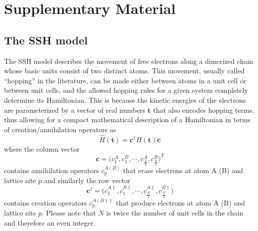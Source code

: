 \documentclass[10pt]{revtex4-1}
\begin{document}
\section*{Supplementary Material}
\subsection*{The SSH model}
\label{sshapp}

The SSH model \cite{asboth2016short} describes the movement of free electrons along a dimerized chain whose basic units consist of two distinct atoms. This movement, usually called ``hopping'' in the literature, can be made either between atoms in a unit cell or between unit cells, and the allowed hopping rules for a given system completely determine its Hamiltonian. This is because the kinetic energies of the electrons are parameterized by a vector of real numbers $\mathbf{t}$ that also encodes hopping terms, thus allowing for a compact mathematical description of a Hamiltonian in terms of creation/annihilation operators as
\begin{equation}
\label{SSH}
\hat{H}(\mathbf{t})=\mathbf{c}^{\dagger}H(\mathbf{t})\mathbf{c}
\end{equation}
where the column vector
\begin{equation*}
\mathbf{c} =\Big(c^{A}_1,c^{B}_1,\cdots,c^{A}_\frac{N}{2},c^{B}_\frac{N}{2}\Big)^T
\end{equation*}
contains annihilation operators $c^{A(B)}_p$ that erase electrons at atom A (B) and lattice site $p$ and similarly the row vector
\begin{equation*}
\mathbf{c}^\dagger =\Big(c^{A\dagger}_1,c^{B\dagger}_1,\cdots,c^{A\dagger}_\frac{N}{2},c^{B\dagger}_\frac{N}{2}\Big)
\end{equation*}
contains creation operators $c^{A(B)\dagger}_p$ that produce electrons at atom A (B) and lattice site $p$. Please note that $N$ is twice the number of unit cells in the chain and therefore an even integer.
\end{document}
